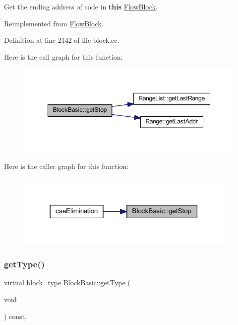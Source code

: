 Get the ending address of code in {\bfseries{this}} \mbox{\hyperlink{class_flow_block}{Flow\+Block}}. 



Reimplemented from \mbox{\hyperlink{class_flow_block_a5448927fcc62a519c92c8afcbf54e35f}{Flow\+Block}}.



Definition at line 2142 of file block.\+cc.

Here is the call graph for this function\+:
\nopagebreak
\begin{figure}[H]
\begin{center}
\leavevmode
\includegraphics[width=348pt]{class_block_basic_af9fb755c152296c5f3110e9dc0f51bd3_cgraph}
\end{center}
\end{figure}
Here is the caller graph for this function\+:
\nopagebreak
\begin{figure}[H]
\begin{center}
\leavevmode
\includegraphics[width=302pt]{class_block_basic_af9fb755c152296c5f3110e9dc0f51bd3_icgraph}
\end{center}
\end{figure}
\mbox{\label{class_block_basic_aeb3a61f4e372495d0644f56c5c20f974}} 
\subsubsection{\texorpdfstring{getType()}{getType()}}
{\footnotesize\ttfamily virtual \mbox{\hyperlink{class_flow_block_a70df78390870fcdd51e31426ba6a193e}{block\+\_\+type}} Block\+Basic\+::get\+Type (\begin{DoxyParamCaption}\item[{void}]{ }\end{DoxyParamCaption}) const\hspace{0.3cm}{\ttfamily [inline]}, {\ttfamily [virtual]}}



